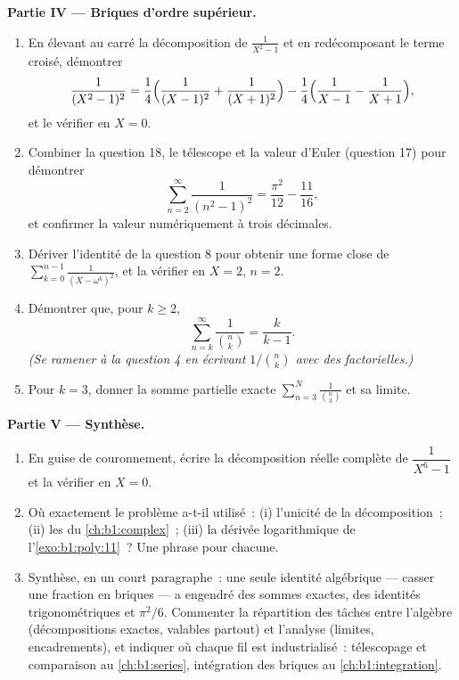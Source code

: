 \begin{problem}
\medskip
\noindent\textbf{Partie IV --- Briques d'ordre supérieur.}
\begin{enumerate}[resume]
  \item En élevant au carré la décomposition de $\frac1{X^2-1}$ et en
        redécomposant le terme croisé, démontrer
        \[
        \frac1{(X^2-1)^2}
        = \frac14\Bigl(\frac1{(X-1)^2} + \frac1{(X+1)^2}\Bigr)
        - \frac14\Bigl(\frac1{X-1} - \frac1{X+1}\Bigr),
        \]
        et le vérifier en $X = 0$.
  \item Combiner la question 18, le télescope et la valeur d'Euler
        (question 17) pour démontrer
        \[
        \sum_{n=2}^{\infty}\frac1{(n^2-1)^2}
        = \frac{\pi^2}{12} - \frac{11}{16} ,
        \]
        et confirmer la valeur numériquement à trois décimales.
  \item Dériver l'identité de la question 8 pour obtenir une forme
        close de $\sum_{k=0}^{n-1}\frac1{(X - \omega^k)^2}$, et la
        vérifier en $X = 2$, $n = 2$.
  \item Démontrer que, pour $k \geq 2$,
        \[
        \sum_{n=k}^{\infty}\frac{1}{\binom nk} = \frac{k}{k-1} .
        \]
        \emph{(Se ramener à la question 4 en écrivant $1/\binom nk$
        avec des factorielles.)}
  \item Pour $k = 3$, donner la somme partielle exacte
        $\sum_{n=3}^{N}\frac1{\binom n3}$ et sa limite.
\end{enumerate}

\medskip
\noindent\textbf{Partie V --- Synthèse.}
\begin{enumerate}[resume]
  \item En guise de couronnement, écrire la décomposition
        réelle complète de $\dfrac1{X^6 - 1}$ et la vérifier en $X =
        0$.
  \item Où exactement le problème a-t-il utilisé~: (i) l'unicité de la
        décomposition~; (ii) les  du
        \cref{ch:b1:complex}~; (iii) la dérivée logarithmique de
        l'\cref{exo:b1:poly:11}~? Une phrase pour chacune.
  \item Synthèse, en un court paragraphe~: une seule identité algébrique
        --- casser une fraction en briques --- a engendré des sommes
        exactes, des identités trigonométriques et $\pi^2/6$. Commenter
        la répartition des tâches entre l'algèbre (décompositions
        exactes, valables partout) et l'analyse (limites, encadrements),
        et indiquer où chaque fil est industrialisé~: télescopage et
        comparaison au \cref{ch:b1:series}, intégration des briques au
        \cref{ch:b1:integration}.
\end{enumerate}
\end{problem}
